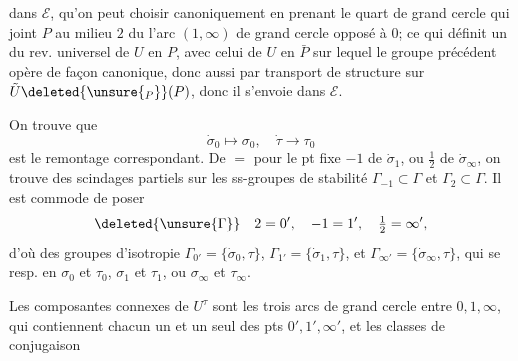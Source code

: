 dans $\mathcal E$, qu'on peut choisir canoniquement en prenant le quart de grand cercle qui joint $P$ au milieu $2$ du  l'arc $(1,\infty)$ de grand cercle opposé à $0$; ce qui définit un  du rev. universel de $U$ en $P$, avec celui de $U$ en $\bar P$ sur lequel le groupe précédent opère de façon canonique, donc aussi par transport de structure sur $\tilde U\deleted{\unsure{_P}}(P)$, donc il s'envoie dans $\mathcal E$.

On trouve que
\[
\dot\sigma_0\mapsto\sigma_0,\quad\dot\tau\to\tau_0
\]
est le remontage correspondant. De $=$ pour le pt fixe $-1$ de $\dot\sigma_1$, ou $\frac12$ de $\dot\sigma_\infty$, on trouve des scindages partiels sur les ss-groupes de  stabilité $\Gamma_{-1}\subset\Gamma$ et $\Gamma_2\subset\Gamma$. Il est commode de poser
\[
\deleted{\unsure{\Gamma}}\quad 2=0',\quad -1=1',\quad \tfrac12=\infty',
\]
d'où des groupes d'isotropie $\Gamma_{0'}=\{\dot\sigma_0,\tau\}$, $\Gamma_{1'}=\{\dot\sigma_1,\tau\}$, et $\Gamma_{\infty'}=\{\dot\sigma_\infty,\tau\}$, qui se  resp. en $\sigma_0$ et $\tau_0$,  $\sigma_1$ et $\tau_1$, ou $\sigma_\infty$ et $\tau_\infty$.

Les composantes connexes de $U^\tau$ sont les trois arcs de grand cercle entre $0,1,\infty$, qui contiennent chacun un  et un seul des pts $0',1',\infty'$, et les classes de conjugaison
